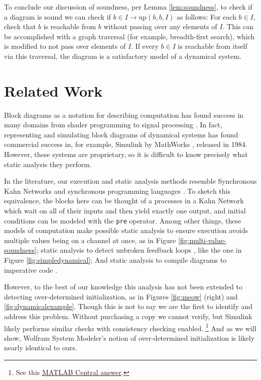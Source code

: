\documentclass[twocolumn]{article}
\begin{document}
To conclude our discussion of soundness, per Lemma \ref{lem:soundness}, to check if a diagram is sound we can check if $b\in I\rightarrow \text{up}(b, b, I)$ as follows: For each $b\in I$, check that $b$ is reachable from $b$ without passing over any elements of $I$. This can be accomplished with a graph traversal (for example, breadth-first search), which is modified to not pass over elements of $I$. If every $b\in I$ is reachable from itself via this traversal, the diagram is a satisfactory model of a dynamical system.

\section{Related Work}\label{sec:related-work}

Block diagrams as a notation for describing computation has found success in many domains from shader programming \cite{Blender} to signal processing \cite{Cycling74}. In fact, representing and simulating block diagrams of dynamical systems has found commercial success in, for example, Simulink by MathWorks \cite{Matlab}, released in 1984. However, these systems are proprietary, so it is difficult to know precisely what static analysis they perform.

In the literature, our execution and static analysis methods resemble Synchronous Kahn Networks \cite{SyncKahn} and synchronous programming languages \cite{SynchronousProgrammingOfReactiveSystems} \cite{EDWARDS200321}. To sketch this equivalence, the blocks here can be thought of a processes in a Kahn Network which wait on all of their inputs and then yield exactly one output, and initial conditions can be modeled with the \texttt{pre} operator. Among other things, these models of computation make possible static analysis to ensure execution avoids multiple values being on a channel at once, as in Figure \ref{fig:multi-value-soundness}; static analysis to detect unbroken feedback loops \cite{SynchronousCausality}, like the one in Figure \ref{fig:simpledynamical}; And static analysis to compile diagrams to imperative code \cite{SyncKahn}.

However, to the best of our knowledge this analysis has not been extended to detecting over-determined initialization, as in Figures \ref{fig:meow} (right) and \ref{fig:dynamicalexample}. Though this is not to say we are the first to identify and address this problem. Without purchasing a copy we cannot verify, but  Simulink likely performs similar checks with consistency checking enabled. \footnote{See this \href{https://www.mathworks.com/matlabcentral/answers/98768-why-does-my-simulink-model-generate-the-error-simulation-is-terminating-because-matlab-has-detected\#answer_108116}{\uline{MATLAB Central answer}}.} And as we will show, Wolfram System Modeler's \cite{SystemModeler} notion of over-determined initialization is likely nearly identical to ours.
\end{document}
